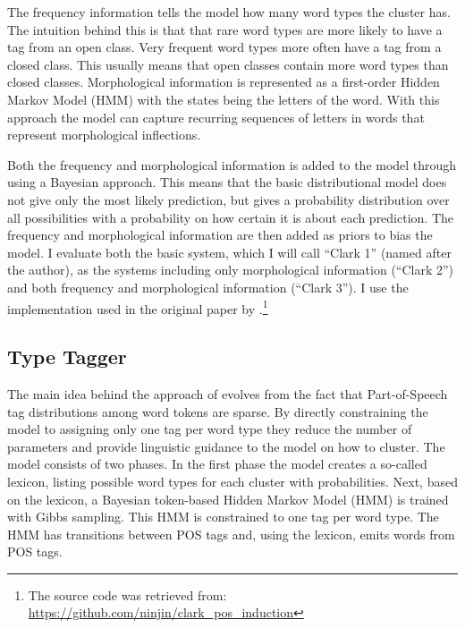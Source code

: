 \documentclass[11pt]{article}
\begin{document}
{The frequency information tells the model how many word types the cluster has. The intuition behind this is that that rare word types are more likely to have a tag from an open class. Very frequent word types more often have a tag from a closed class. This usually means that open classes contain more word types than closed classes. Morphological information is represented as a first-order Hidden Markov Model (HMM) with the states being the letters of the word. With this approach the model can capture recurring sequences of letters in words that represent morphological inflections.   

Both the frequency and morphological information is added to the model through using a Bayesian approach. This means that the basic distributional model does not give only the most likely prediction, but gives a probability distribution over all possibilities with a probability on how certain it is about each prediction. The frequency and morphological information are then added as priors to bias the model. I evaluate both the basic system, which I will call ``Clark 1'' (named after the author), as the systems including only morphological information (``Clark 2'') and both frequency and morphological information (``Clark 3''). I use the implementation used in the original paper by \cite{clark2003cda}.\footnote{The source code was retrieved from: \url{https://github.com/ninjin/clark_pos_induction}}

\subsection{Type Tagger}
\label{type_tagger}
The main idea behind the approach of \cite{lee2010simple} evolves from the fact that Part-of-Speech tag distributions among word tokens are sparse. By directly constraining the model to assigning only one tag per word type they reduce the number of parameters and provide linguistic guidance to the model on how to cluster. The model consists of two phases. In the first phase the model creates a so-called lexicon, listing possible word types for each cluster with probabilities. Next, based on the lexicon, a Bayesian token-based Hidden Markov Model (HMM) is trained with Gibbs sampling. This HMM is constrained to one tag per word type. The HMM has transitions between POS tags and, using the lexicon, emits words from POS tags. 

}
\end{document}
